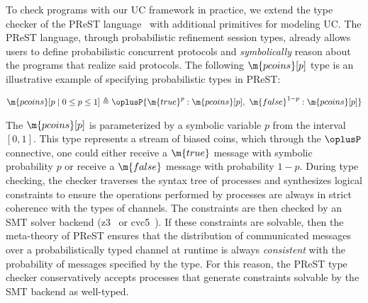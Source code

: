 To check programs with our UC framework in practice, we extend the type checker of the
PReST language~\cite{prest} with additional primitives for modeling UC. The PReST
language, through probabilistic refinement session types, already allows users to define
probabilistic concurrent protocols and \emph{symbolically} reason about the programs that
realize said protocols. The following $\m{pcoins}[p]$ type is an illustrative example of 
specifying probabilistic types in PReST:
\begin{small}
\begin{align*}
  \m{pcoins}[p \mid 0 \leq p \leq 1] \triangleq 
    \oplusP\{ \m{true}^{p} : \m{pcoins}[p]
           ,\ \m{false}^{1 - p} : \m{pcoins}[p] \}
\end{align*}
\end{small}
The $\m{pcoins}[p]$ is parameterized by a symbolic variable $p$ from the
interval $[0, 1]$. This type represents a stream of biased coins, which through
the $\oplusP$ connective, one could either receive a $\m{true}$ message
with symbolic probability $p$ or receive a $\m{false}$ message with
probability $1 - p$.  During type checking, the checker traverses the syntax
tree of processes and synthesizes logical constraints to ensure the operations
performed by processes are always in strict coherence with the types of
channels. The constraints are then checked by an SMT solver backend
(z3~\cite{Moura08Z3} or cvc5~\cite{Barbosa22CVC5}). If these constraints are solvable, then the
meta-theory of PReST ensures that the distribution of communicated messages over
a probabilistically typed channel at runtime is always \emph{consistent} with
the probability of messages specified by the type. For this reason, the PReST
type checker conservatively accepts processes that generate constraints solvable
by the SMT backend as well-typed.

